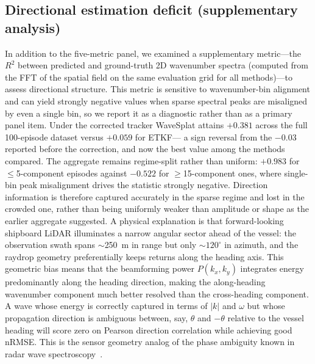 
\subsection{Directional estimation deficit (supplementary analysis)}
\label{sec:dirdeficit}

In addition to the five-metric panel, we examined a supplementary
metric---the $R^2$ between predicted and ground-truth 2D wavenumber
spectra (computed from the FFT of the spatial field on the same
evaluation grid for all methods)---to assess directional structure.
This metric is sensitive to wavenumber-bin alignment and can yield
strongly negative values when sparse spectral peaks are misaligned by
even a single bin, so we report it as a diagnostic rather than as
a primary panel item.  Under the corrected tracker WaveSplat attains
$+0.381$ across the full 100-episode dataset versus $+0.059$ for ETKF---%
a sign reversal from the $-0.03$ reported before the correction, and now
the best value among the methods compared.
The aggregate remains regime-split rather than uniform: $+0.983$ for
$\leq$5-component episodes against $-0.522$ for $\geq$15-component ones,
where single-bin peak misalignment drives the statistic strongly negative.
Direction information is therefore captured accurately in the sparse
regime and lost in the crowded one, rather than being uniformly weaker
than amplitude or shape as the earlier aggregate suggested.
A physical explanation is that forward-looking shipboard LiDAR
illuminates a narrow angular sector ahead of the vessel: the
observation swath spans $\sim$250~m in range but only
${\sim}120^\circ$ in azimuth, and the raydrop geometry preferentially
keeps returns along the heading axis.
This geometric bias means that the beamforming power $P(k_x, k_y)$
integrates energy predominantly along the heading direction, making
the along-heading wavenumber component much better resolved than the
cross-heading component.  A wave whose energy is correctly captured in
terms of $|k|$ and $\omega$ but whose propagation direction is
ambiguous between, say, $\theta$ and $-\theta$ relative to the vessel
heading will score zero on Pearson direction correlation while
achieving good nRMSE.  This is the sensor geometry analog of the
phase ambiguity known in radar wave spectroscopy~\citep{nieto2004}.

